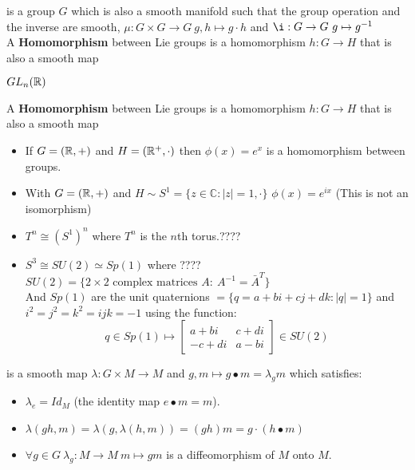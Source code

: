 \begin{ddef}
is a group $G$ which is also a smooth manifold such that the group operation and the inverse are smooth, $\mu: G\times G \to G \ g,h\mapsto g\cdot h$ and $\i: G\to G\ g\mapsto g^{-1}$\\
A \textbf{Homomorphism} between Lie groups is a homomorphism $h:G\to H$ that is also a smooth map
\end{ddef}

\begin{examples}
$GL_n(\mathbb{R})$
\end{examples}

\begin{ddef}
A \textbf{Homomorphism} between Lie groups is a homomorphism $h:G\to H$ that is also a smooth map
\end{ddef}

\begin{examples}

\begin{itemize}
\item If $G=(\mathbb{R},+)$ and $H=(\mathbb{R}^+,\cdot)$ then $\phi(x)=e^x$ is a homomorphism between groups.
\item With $G=(\mathbb{R},+)$ and $H\sim S^1 =\{z\in \mathbb{C}: |z|=1,\cdot \}$ $\phi(x)=e^{ix}$ (This is not an isomorphism)
\item $T^n\cong(S^1)^n$ where $T^n$ is the $n$th torus.????
\item $S^3\cong SU(2) \simeq Sp(1)$ where  ???? $SU(2)=\{2\times 2 \text{ complex matrices }A: \ A^{-1} = \bar A^T\} $ \\
And $Sp(1)$ are the unit quaternions $=\{q= a+bi+cj+dk : |q|=1 \}$ and $i^2=j^2=k^2=ijk=-1$ using the function: 
    $$ q\in Sp(1) \mapsto \begin{bmatrix} a+bi & c+di \\ -c+di & a-bi \end{bmatrix}\in SU(2) $$
\end{itemize}
\end{examples}  

\begin{ddef}
is a smooth map $\lambda: G\times M \to M$ and $g,m \mapsto g\bullet m = \lambda_g m $ which satisfies:
    \begin{itemize}
    \item $\lambda_e=Id_M$ (the identity map $e\bullet m=m$).
    \item $\lambda(gh,m) = \lambda(g, \lambda(h,m))= (gh)m = g\cdot (h\bullet m)$
    \item $\forall g\in G \ \lambda_g: M\to M\ m\mapsto gm$ is a diffeomorphism of $M$ onto $M$.
    \end{itemize}
\end{ddef}

